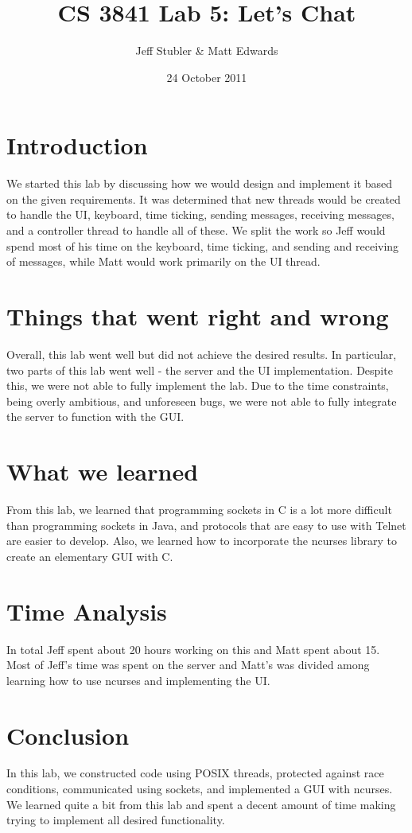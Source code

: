 \documentclass{article}
\begin{document}
\title{CS 3841 Lab 5: Let's Chat}
\author{Jeff Stubler & Matt Edwards}
\date{24 October 2011}
\maketitle

\section*{Introduction}
We started this lab by discussing how we would design and implement it based on the given requirements. It was determined that new threads would be created to handle the UI, keyboard, time ticking, sending messages, receiving messages, and a controller thread to handle all of these. We split the work so Jeff would spend most of his time on the keyboard, time ticking, and sending and receiving of messages, while Matt would work primarily on the UI thread.

\section*{Things that went right and wrong}
Overall, this lab went well but did not achieve the desired results. In particular, two parts of this lab went well - the server and the UI implementation. Despite this, we were not able to fully implement the lab. Due to the time constraints, being overly ambitious, and unforeseen bugs, we were not able to fully integrate the server to function with the GUI.

\section*{What we learned}
From this lab, we learned that programming sockets in C is a lot more difficult than programming sockets in Java, and protocols that are easy to use with Telnet are easier to develop. Also, we learned how to incorporate the ncurses library to create an elementary GUI with C.

\section*{Time Analysis}
In total Jeff spent about 20 hours working on this and Matt spent about 15. Most of Jeff's time was spent on the server and Matt's was divided among learning how to use ncurses and implementing the UI.

\section*{Conclusion}
In this lab, we constructed code using POSIX threads, protected against race conditions, communicated using sockets, and implemented a GUI with ncurses. We learned quite a bit from this lab and spent a decent amount of time making trying to implement all desired functionality.
\end{document}
